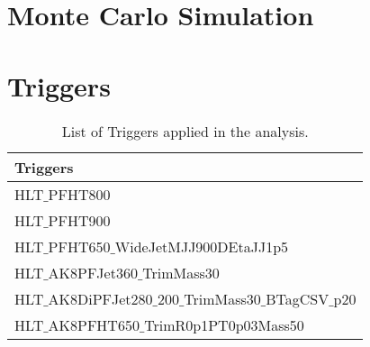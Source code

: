 \section{Monte Carlo Simulation} \label{Monte Carlo Simulation}	

\section{Triggers} \label{Triggers}
\begin{table}[h!]
  \begin{center}
    \begin{tabular}{l}
    Triggers \\
    \hline
    HLT$\_$PFHT800 \\
    HLT$\_$PFHT900 \\
    HLT$\_$PFHT650$\_$WideJetMJJ900DEtaJJ1p5 \\
    HLT$\_$AK8PFJet360$\_$TrimMass30 \\
    HLT$\_$AK8DiPFJet280$\_$200$\_$TrimMass30$\_$BTagCSV$\_$p20 \\
    HLT$\_$AK8PFHT650$\_$TrimR0p1PT0p03Mass50 \\
    \hline
    \end{tabular}
  \end{center}

  \caption{List of Triggers applied in the analysis.}
\end{table} 



